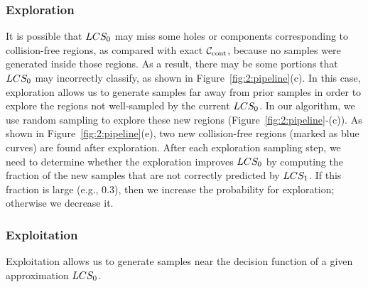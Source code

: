 \subsubsection{Exploration}
It is possible that $LCS_0$ may miss some holes or components corresponding to collision-free regions, as compared with exact
$\mathcal C_\text{cont}$, because no samples were generated inside those regions.
As a result, there may be some portions that $LCS_0$ may incorrectly classify, as shown in Figure~\ref{fig:2:pipeline}(c). In this case,
exploration allows us to generate samples far away from prior
samples in order to explore the regions not well-sampled by the
current $LCS_0$. In our algorithm, we use random sampling to
explore these new regions (Figure~\ref{fig:2:pipeline}-(c)). As
shown in Figure~\ref{fig:2:pipeline}(e), two new collision-free
regions (marked as blue curves) are found after exploration. After
each exploration sampling step, we need to determine whether the
exploration improves $LCS_0$ by computing the fraction of the new
samples that are not correctly predicted by $LCS_1$. If this
fraction is large (e.g., $0.3$),
then we increase the probability for exploration; otherwise we
decrease it.


\subsubsection{Exploitation}
Exploitation allows us to generate samples near the decision
function of a given approximation $LCS_0$.


